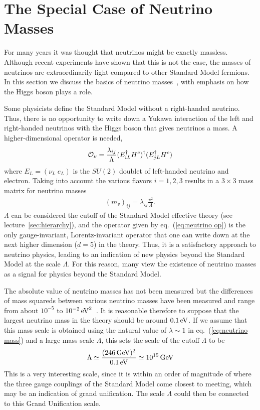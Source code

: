 \documentclass[12pt]{article}
\def\beq{\begin{eqnarray}}
\def\eeq{\end{eqnarray}}
\def\gev{\, {\rm GeV}}
\def\eq#1{eq.~(\ref{#1})}
\begin{document}
\section{The Special Case of Neutrino Masses\label{sec:neutrinos}}

For many years it was thought that neutrinos might be exactly massless. Although recent experiments have shown that this is not the case, the masses of neutrinos are extraordinarily light compared to other Standard Model fermions. In this section we discuss the basics of neutrino masses~\cite{neutrino reviews}, with emphasis on how the Higgs boson plays a role.

Some physicists define the Standard Model without a right-handed neutrino. Thus, there is no opportunity to write down a Yukawa interaction of the left and right-handed neutrinos with the Higgs boson that gives neutrinos a mass. A higher-dimensional operator is needed,
\beq
{\cal O}_\nu =\frac{\lambda_{ij}}{\Lambda} (E_{iL}^\dagger H^c)^\dagger (E_{jL}^\dagger H^c)
\label{eq:neutrino op}
\eeq
where $E_L=(\nu_L~e_L)$ is the $SU(2)$ doublet of left-handed neutrino and electron. Taking into account the various flavors $i=1,2,3$ 
results in a $3\times 3$ mass matrix for neutrino masses
\beq
(m_{v})_{ij}=\lambda_{ij}\frac{v^2}{\Lambda}.
\label{eq:neutrino mass}
\eeq
$\Lambda$ can be considered the cutoff of the Standard Model effective theory (see lecture~\ref{sec:hierarchy}), and the operator given by \eq{eq:neutrino op} is the only gauge-invariant, Lorentz-invariant operator that one can write down at the next higher dimension ($d=5$) in the theory. Thus, it is a satisfactory approach to neutrino physics, leading to an indication of new physics beyond the Standard Model at the scale $\Lambda$. For this reason, many view the existence of neutrino masses as a signal for physics beyond the Standard Model.

The absolute value of neutrino masses has not been measured but the differences of mass squareds between various neutrino masses have been measured and range from about $10^{-5}$ to $10^{-2}\, {\rm eV}^2$~\cite{neutrino reviews}.  It is reasonable therefore to suppose that the largest neutrino mass in the theory should be around $0.1\, {\rm eV}$.  If we assume that this mass scale is obtained using the natural  value of $\lambda\sim 1$ in \eq{eq:neutrino mass} and a large mass scale $\Lambda$, this sets the scale of the cutoff $\Lambda$ to be
\beq
\Lambda\simeq \frac{(246\gev)^2}{0.1\, {\rm eV}}\simeq 10^{15}\gev
\eeq
This is a very interesting scale, since it is within an order of magnitude of where the three gauge couplings of the Standard Model come closest to meeting, which may be an indication of grand unification. The scale $\Lambda$ could then be connected to this Grand Unification scale.
\end{document}
